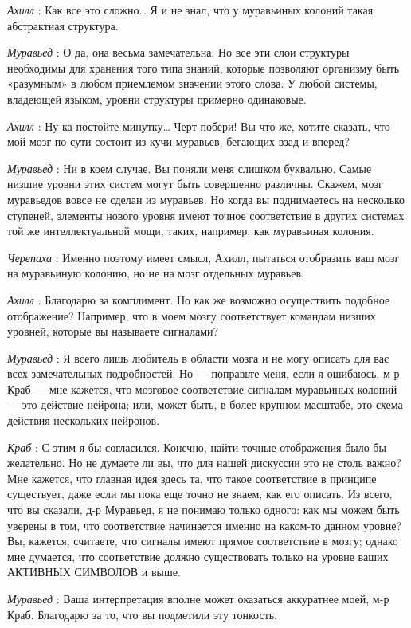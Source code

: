 \documentclass[../main.tex]{subfiles}
\begin{document}
\begin{dialogue}
\emph{Ахилл} : Как все это сложно\ldots{} Я и не знал, что у муравьиных колоний такая абстрактная структура.

\emph{Муравьед} : О да, она весьма замечательна. Но все эти слои структуры необходимы для хранения того типа знаний, которые позволяют организму быть «разумным» в любом приемлемом значении этого слова. У любой системы, владеющей языком, уровни структуры примерно одинаковые.

\emph{Ахилл} : Ну-ка постойте минутку\ldots{} Черт побери! Вы что же, хотите сказать, что мой мозг по сути состоит из кучи муравьев, бегающих взад и вперед?

\emph{Муравьед} : Ни в коем случае. Вы поняли меня слишком буквально. Самые низшие уровни этих систем могут быть совершенно различны. Скажем, мозг муравьедов вовсе не сделан из муравьев. Но когда вы поднимаетесь на несколько ступеней, элементы нового уровня имеют точное соответствие в других системах той же интеллектуальной мощи, таких, например, как муравьиная колония.

\emph{Черепаха} : Именно поэтому имеет смысл, Ахилл, пытаться отобразить ваш мозг на муравьиную колонию, но не на мозг отдельных муравьев.

\emph{Ахилл} : Благодарю за комплимент. Но как же возможно осуществить подобное отображение? Например, что в моем мозгу соответствует командам низших уровней, которые вы называете сигналами?

\emph{Муравьед} : Я всего лишь любитель в области мозга и не могу описать для вас всех замечательных подробностей. Но --- поправьте меня, если я ошибаюсь, м-р Краб --- мне кажется, что мозговое соответствие сигналам муравьиных колоний --- это действие нейрона; или, может быть, в более крупном масштабе, это схема действия нескольких нейронов.

\emph{Краб} : С этим я бы согласился. Конечно, найти точные отображения было бы желательно. Но не думаете ли вы, что для нашей дискуссии это не столь важно? Мне кажется, что главная идея здесь та, что такое соответствие в принципе существует, даже если мы пока еще точно не знаем, как его описать. Из всего, что вы сказали, д-р Муравьед, я не понимаю только одного: как мы можем быть уверены в том, что соответствие начинается именно на каком-то данном уровне? Вы, кажется, считаете, что сигналы имеют прямое соответствие в мозгу; однако мне думается, что соответствие должно существовать только на уровне ваших АКТИВНЫХ СИМВОЛОВ и выше.

\emph{Муравьед} : Ваша интерпретация вполне может оказаться аккуратнее моей, м-р Краб. Благодарю за то, что вы подметили эту тонкость.


\end{dialogue}
\end{document}
